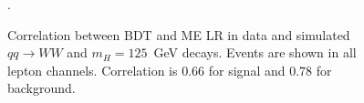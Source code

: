 \begin{figure}[!hbtp]
\centering
{}
\caption{Correlation between BDT and ME LR in data
and simulated $qq\rightarrow WW$ and $m_{H}=125$~GeV decays.
Events are shown in all lepton channels.  Correlation is $0.66$ for signal and $0.78$ for background.}.
\label{fig:me_correlations_all}
\end{figure}

